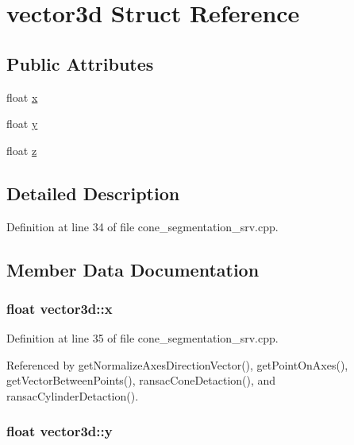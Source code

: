\hypertarget{structvector3d}{\section{vector3d Struct Reference}
\label{structvector3d}
}
\subsection*{Public Attributes}
\begin{DoxyCompactItemize}
\item 
float \hyperlink{structvector3d_add24ba608397ce7664f51369fc6a1ba4}{x}
\item 
float \hyperlink{structvector3d_a64dec3fa34e765f42a7c716dbc4559d2}{y}
\item 
float \hyperlink{structvector3d_a4e5e948ffcf14e91ebec29e889ced5be}{z}
\end{DoxyCompactItemize}


\subsection{Detailed Description}


Definition at line 34 of file cone\-\_\-segmentation\-\_\-srv.\-cpp.



\subsection{Member Data Documentation}
\hypertarget{structvector3d_add24ba608397ce7664f51369fc6a1ba4}{
\subsubsection[{x}]{\setlength{\rightskip}{0pt plus 5cm}float vector3d\-::x}}\label{structvector3d_add24ba608397ce7664f51369fc6a1ba4}


Definition at line 35 of file cone\-\_\-segmentation\-\_\-srv.\-cpp.



Referenced by get\-Normalize\-Axes\-Direction\-Vector(), get\-Point\-On\-Axes(), get\-Vector\-Between\-Points(), ransac\-Cone\-Detaction(), and ransac\-Cylinder\-Detaction().

\hypertarget{structvector3d_a64dec3fa34e765f42a7c716dbc4559d2}{
\subsubsection[{y}]{\setlength{\rightskip}{0pt plus 5cm}float vector3d\-::y}}\label{structvector3d_a64dec3fa34e765f42a7c716dbc4559d2}


